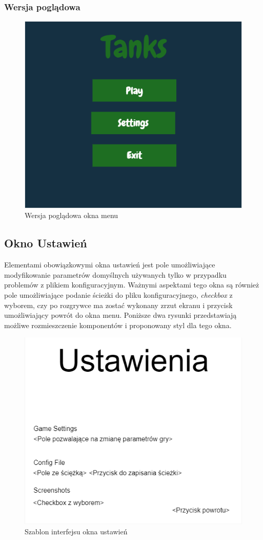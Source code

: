 \documentclass[11pt,a4paper]{report}
\begin{document}
\subsubsection{Wersja poglądowa}
\begin{figure}[!ht]
\centerline{\includegraphics{img/menu2.png}}
\caption{Wersja poglądowa okna menu}
\end{figure}
\newpage
\subsection{Okno Ustawień}
Elementami obowiązkowymi okna ustawień jest pole umożliwiające modyfikowanie parametrów domyślnych używanych tylko w przypadku problemów z plikiem konfiguracyjnym. Ważnymi aspektami tego okna są również pole umożliwiające podanie ścieżki do pliku konfiguracyjnego, \textsl{checkbox} z wyborem, czy po rozgrywce ma zostać wykonany zrzut ekranu i przycisk umożliwiający powrót do okna menu. Poniższe dwa rysunki przedstawiają możliwe rozmieszczenie komponentów i proponowany styl dla tego okna.
\begin{figure}[!ht]
\centerline{\includegraphics{img/sett1.png}}
\caption{Szablon interfejsu okna ustawień}
\end{figure}
\newpage
\end{document}

